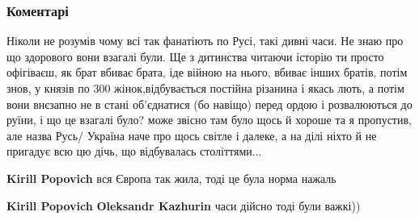  
 
 
 
 
\subsubsection{Коментарі}
\label{sec:03_09_2021.fb.dudka_bulyga_oleksandr.1.rus_ukraina_konserva.cmt}

\begin{itemize}
 

Ніколи не розумів чому всі так фанатіють по Русі, такі дивні часи. Не знаю про
що здорового вони взагалі були. Ще з дитинства читаючи історію ти просто
офігіваєш, як брат вбиває брата, іде війною на нього, вбиває інших братів,
потім знов, у князів по 300 жінок,відбувається постійна різанина і якась лють,
а потім вони внєзапно не в стані об'єднатися (бо навіщо) перед ордою і
розвалюються до руїни, і що це взагалі було? може звісно там було щось й хороше
та я пропустив, але назва Русь/ Україна наче про щось світле і далеке, а на
ділі ніхто й не пригадує всю цю дічь, що відбувалась століттями...


\begin{itemize}
 
\textbf{Kirill Popovich} вся Європа так жила, тоді це була норма нажаль

 
\textbf{Kirill Popovich} \textbf{Oleksandr Kazhurin} часи дійсно тоді були важкі))
\end{itemize}


\end{itemize}
